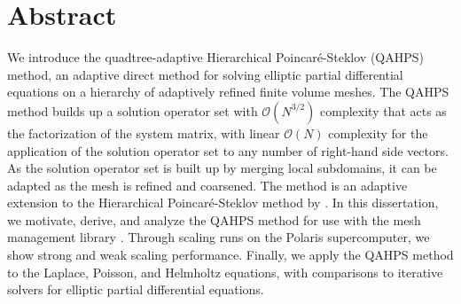 \chapter*{Abstract}


We introduce the quadtree-adaptive Hierarchical Poincar\'e-Steklov (QAHPS) method, an adaptive direct method for solving elliptic partial differential equations on a hierarchy of adaptively refined finite volume meshes. The QAHPS method builds up a solution operator set with $\mathcal{O}(N^{3/2})$ complexity that acts as the factorization of the system matrix, with linear $\mathcal{O}(N)$ complexity for the application of the solution operator set to any number of right-hand side vectors. As the solution operator set is built up by merging local subdomains, it can be adapted as the mesh is refined and coarsened. The method is an adaptive extension to the Hierarchical Poincar\'e-Steklov method by \cite{gillman2014direct}. In this dissertation, we motivate, derive, and analyze the QAHPS method for use with the mesh management library \pforest \citep{burstedde2011p4est}. Through scaling runs on the Polaris supercomputer, we show strong and weak scaling performance. Finally, we apply the QAHPS method to the Laplace, Poisson, and Helmholtz equations, with comparisons to iterative solvers for elliptic partial differential equations.

